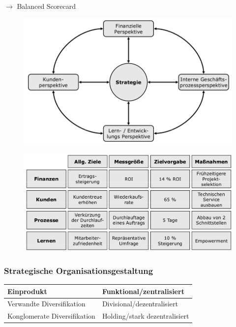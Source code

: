 \documentclass[a4paper,11pt, twoside]{article}
\begin{document}
$\rightarrow$ Balanced Scorecard

\begin{figure}[h]
 \begin{center}
   \includegraphics[scale=0.3]{bilder/strategische_balancedscorecard.png}
 \end{center}
\end{figure}

\begin{figure}[h]
 \begin{center}
   \includegraphics[scale=0.3]{bilder/strategische_balancedscorecard2.png}
 \end{center}
\end{figure}
\subsubsection*{Strategische Organisationsgestaltung}

\begin{tabular}{|l|l|}
\hline 
Einprodukt & Funktional/zentralisiert \\ 
\hline 
Verwandte Diversifikation & Divisional/dezentralisiert \\ 
\hline 
Konglomerate Diversifikation & Holding/stark dezentralisiert \\ 
\hline 
\end{tabular} 
\end{document}
